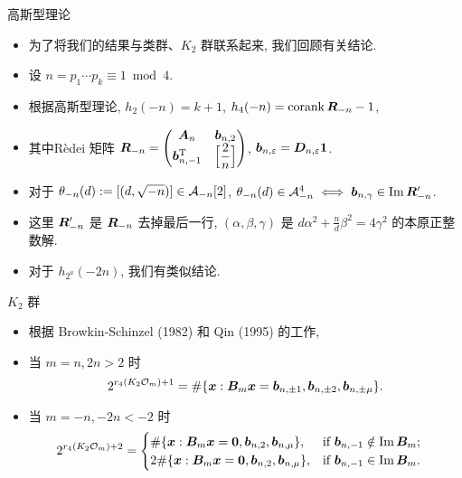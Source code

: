 \documentclass[aspectratio=169]{ctexbeamer}
\renewcommand\aleg[2]{\Bigl[\dfrac{{#1}}{#2}\Bigr]}
\begin{document}
\begin{frame}{高斯型理论}
	\begin{itemize}
		\item 为了将我们的结果与类群、$K_2$ 群联系起来, 我们回顾有关结论.
		\item 设 $n=p_1\cdots p_k\equiv 1\bmod 4$.
		\item 根据高斯型理论, $h_2(-n)=k+1$,  $h_4(-n)=\operatorname{corank} {\boldsymbol{R}}_{-n}-1$,
		\item 其中R\`edei 矩阵 $\bfR_{-n}=\begin{pmatrix}
			\bfA_n&\bfb_{n,2}\\
			\bfb_{n,-1}^\rmT&\aleg{2}{n}
		\end{pmatrix}$, ${\boldsymbol{b}}_{n,\varepsilon}={\boldsymbol{D}}_{n,\varepsilon}{\bf1}$.
		\item 对于 $\theta_{-n}(d):=[(d,\sqrt{-n})]\in{\mathcal{A}}_{-n}[2]$, $\theta_{-n}(d)\in {\mathcal{A}}_{-n}^4\iff {\boldsymbol{b}}_{n,\gamma}\in \operatorname{Im}{\boldsymbol{R}}_{-n}'$.
		\item 这里 ${\boldsymbol{R}}_{-n}'$ 是 ${\boldsymbol{R}}_{-n}$ 去掉最后一行, $(\alpha,\beta,\gamma)$ 是 $d\alpha^2+\frac{n}{d}\beta^2=4\gamma^2$ 的本原正整数解.
		\item 对于 $h_{2^a}(-2n)$, 我们有类似结论.
	\end{itemize}
\end{frame}


\begin{frame}{$K_2$ 群}
	\begin{itemize}
		\item 根据 Browkin-Schinzel (1982) 和 Qin (1995) 的工作, 
		\item 当 $m=n,2n>2$ 时
		\[
			2^{r_4(K_2{\mathcal{O}}_m)+1}=\#\{{\boldsymbol{x}}:{\boldsymbol{B}}_m{\boldsymbol{x}}={\boldsymbol{b}}_{n,\pm1},{\boldsymbol{b}}_{n,\pm2},{\boldsymbol{b}}_{n,\pm\mu}\}.
		\]
		\item 当 $m=-n,-2n<-2$ 时
		\[
			\begin{aligned}	
				2^{r_4(K_2\CO_m)+2}&
				=\begin{cases}
					\#\{\bfx:\bfB_m\bfx={\bf0},\bfb_{n,2},\bfb_{n,\mu}\},&\text{if}\ \bfb_{n,-1}\notin\Im \bfB_m;\\
					2\#\{\bfx:\bfB_m\bfx={\bf0},\bfb_{n,2},\bfb_{n,\mu}\},&\text{if}\ \bfb_{n,-1}\in\Im \bfB_m.
				\end{cases}
			\end{aligned}
		\]
	\end{itemize}
\end{frame}
\end{document}
